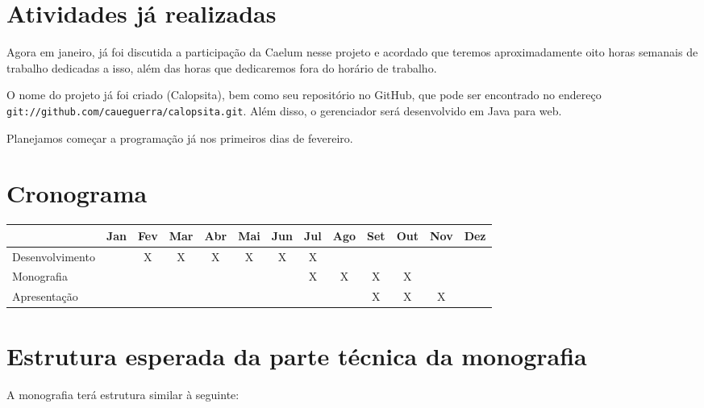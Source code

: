 \documentclass[titlepage]{article}
\begin{document}
\section{Atividades já realizadas}
Agora em janeiro, já foi discutida a participação da Caelum nesse projeto e acordado que teremos aproximadamente oito horas semanais de trabalho dedicadas a isso, além das horas que dedicaremos fora do horário de trabalho.

O nome do projeto já foi criado (Calopsita), bem como seu repositório no GitHub, que pode ser encontrado no endereço \texttt{git://github.com/caueguerra/calopsita.git}. Além disso, o gerenciador será desenvolvido em Java para web.

Planejamos começar a programação já nos primeiros dias de fevereiro.

\section{Cronograma}
\begin{tabular}{|l|c|c|c|c|c|c|c|c|c|c|c|c|}
  \hline
  & Jan & Fev & Mar & Abr & Mai & Jun & Jul & Ago & Set & Out & Nov & Dez \\ \hline
  Desenvolvimento	&  & X& X& X& X& X& X&  &  &  &  & \\ \hline
  Monografia 		&  &  &  &  &  &  & X& X& X& X&  & \\ \hline
  Apresentação 		&  &  &  &  &  &  &  &  & X& X& X& \\ \hline
\end{tabular}

\section{Estrutura esperada da parte técnica da monografia}

A monografia terá estrutura similar à seguinte:
\end{document}
